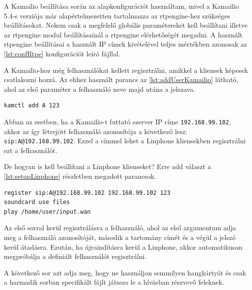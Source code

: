A Kamailio beállítása során az alapkonfigurációt használtam, mivel a Kamailio 5.4-s verziója már alapértelmezetten tartalmazza az rtpengine-hez szükséges beállításokat. Nekem csak a megfelelő globális paramétereket kell beállítani illetve az rtpengine modul beállításainál a rtpengine elérhetőségét megadni. A használt rtpengine beállításai a használt IP címek kivételével teljes mértékben azonosak az \ref{lst:confRtpe} konfigurációt leíró fájllal. 

A Kamailio-hoz még felhasználókat kellett regisztrálni, amikkel a kliensek képesek 
csatlakozni hozzá. Az ehhez használt parancs az \ref{lst:addUserKamailio} látható, ahol 
az első paraméter a felhasználó neve majd utána a jelszava.

\begin{lstlisting}[caption=Felhasználó hozzáadása Kamailio-hoz, label=lst:addUserKamailio]
kamctl add A 123
\end{lstlisting}

Abban az esetben, ha a Kamailio-t futtató szerver IP címe \texttt{192.168.99.102}, akkor az így létrejött felhasználó azonosítója a következő lesz: \texttt{sip:A@192.168.99.102}. Ezzel a címmel lehet a Linphone kliensekben regisztrálni ezt a felhasználót. 

De hogyan is kell beállítani a Linphone klienseket? Erre add választ a \ref{lst:setupLinphone} részletben megadott parancsok. 

\begin{lstlisting}[caption=Linphone beállítása, label=lst:setupLinphone]
register sip:A@192.168.99.102 192.168.99.102 123
soundcard use files
play /home/user/input.wan
\end{lstlisting}

Az első sorral kerül regisztrálásra a felhasználó, ahol az első argumentum adja meg a 
felhasználó azonosítóját, második a tartomány címét és a végül a jelszó kerül átadásra. 
Ezután, ha újraindításra kerül a Linphone, akkor automatikusan megpróbálja a definiált
felhasználót regisztrálni. 

A következő sor azt adja meg, hogy ne használjon semmilyen hangkártyát és csak a 
harmadik sorban specifikált fájlt játssza le a hívásban részvevő feleknek.

